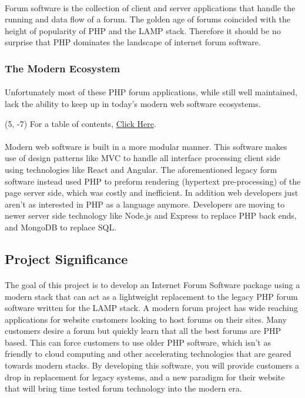 \documentclass[]{article}
\begin{document}
\paragraph{}
Forum software is the collection of client and server applications that handle the running and data flow of a forum. The golden age of forums coincided with the height of popularity of PHP and the LAMP stack. Therefore it should be no surprise that PHP dominates the landscape of internet forum software. 
\subsubsection{The Modern Ecosystem}
\paragraph{}
Unfortunately most of these PHP forum applications, while still well maintained, lack the ability to keep up in today's modern web software ecosystems. 
\begin{textblock}{5}(5, -7)
For a table of contents, \hyperref[cont]{Click Here}.
\end{textblock}

\paragraph{}
Modern web software is built in a more modular manner. This software makes use of design patterns like MVC to handle all interface processing client side using technologies like React and Angular. The aforementioned legacy form software instead used PHP to preform rendering (hypertext pre-processing) of the page server side, which was costly and inefficient. In addition web developers just aren't as interested in PHP as a language anymore. Developers are moving to newer server side technology like Node.js and Express to replace PHP back ends, and MongoDB to replace SQL. 

\subsection{Project Significance}
\paragraph{}
The goal of this project is to develop an Internet Forum Software package using a modern stack that can act as a lightweight replacement to the legacy PHP forum software written for the LAMP stack. A modern forum project has wide reaching applications for website customers looking to host forums on their sites. Many customers desire a forum but quickly learn that all the best forums are PHP based. This can force customers to use older PHP software, which isn't as friendly to cloud computing and other accelerating technologies that are geared towards modern stacks. By developing this software, you will provide customers a drop in replacement for legacy systems, and a new paradigm for their website that will bring time tested forum technology into the modern era. 
\end{document}
